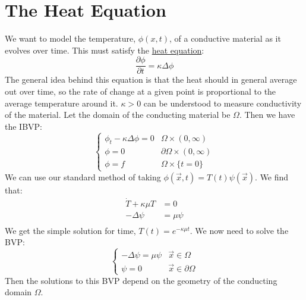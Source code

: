 \documentclass[../Main.tex]{subfiles}
\begin{document}
\section{The Heat Equation}
We want to model the temperature, $\phi(x, t)$, of a conductive material as it evolves over time. This must satisfy the \underline{heat equation}:
\begin{equation}
    \frac{\partial \phi}{\partial t} = \kappa \Delta\phi
    \label{eqnHeat}
\end{equation}
The general idea behind this equation is that the heat should in general average out over time, so the rate of change at a given point is proportional to the average temperature around it. $\kappa > 0$ can be understood to measure conductivity of the material. Let the domain of the conducting material be $\Omega$. Then we have the IBVP:
\begin{equation}
    \begin{cases}
        \phi_t - \kappa \Delta\phi = 0 & \Omega \times (0, \infty) \\
        \phi = 0 & \partial \Omega \times (0, \infty) \\
        \phi = f & \Omega \times \{t = 0\}
    \end{cases}
    \label{eqnHeatIBVP}
\end{equation}
We can use our standard method of taking $\phi(\vec{x}, t) = T(t) \psi(\vec{x})$. We find that:
\begin{align}
    \dot{T} + \kappa \mu T &= 0 \label{eqnHeatTime} \\
    -\Delta \psi &= \mu \psi \label{eqnHeatSpace} \\
\end{align}
We get the simple solution for time, $T(t) = e^{-\kappa \mu t}$. We now need to solve the BVP:
\begin{equation}
    \begin{cases}
        -\Delta \psi = \mu \psi & \vec{x} \in \Omega \\
        \psi = 0 & \vec{x} \in \partial \Omega
    \end{cases}
    \label{eqnHeatBVP}
\end{equation}
Then the solutions to this BVP depend on the geometry of the conducting domain $\Omega$.
\end{document}
